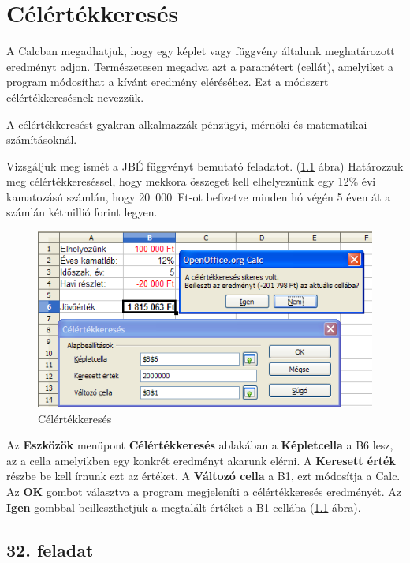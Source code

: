 \chapter{Célértékkeresés}
\thispagestyle{empty}

A Calcban megadhatjuk, hogy egy képlet vagy függvény általunk
meghatározott eredményt adjon. Természetesen megadva azt a
paramétert (cellát), amelyiket a program módosíthat a
kívánt eredmény eléréséhez. Ezt a módszert célértékkeresésnek nevezzük.

A célértékkeresést gyakran alkalmazzák pénzügyi,
mérnöki és matematikai számításoknál.

Vizsgáljuk meg ismét a JBÉ függvényt bemutató feladatot. 
(\ref{Célértékkeresés} ábra) Határozzuk meg célértékkereséssel,
hogy mekkora összeget kell elhelyeznünk egy 12\% évi kamatozású
számlán,  hogy 20~000~Ft-ot befizetve minden hó végén 5
éven át a számlán kétmillió forint legyen.

\begin{figure}[!h]
\begin{center}
\includegraphics[width=13.73cm]{oocalcv2-img140.png}
\caption{Célértékkeresés}\label{Célértékkeresés}
\end{center}
\end{figure}

Az \textbf{Eszközök} menüpont \textbf{Célértékkeresés}
ablakában a \textbf{Képletcella} a B6 lesz, az a cella amelyikben
egy konkrét eredményt akarunk elérni. A \textbf{Keresett
érték} részbe be kell írnunk ezt az értéket. A
\textbf{Változó cella} a B1, ezt módosítja a Calc. Az \textbf{OK} gombot
választva a  program megjeleníti a célértékkeresés
eredményét. Az \textbf{Igen} gombbal beilleszthetjük a
megtalált értéket a B1 cellába (\ref{Célértékkeresés} ábra).


\section{32. feladat}

